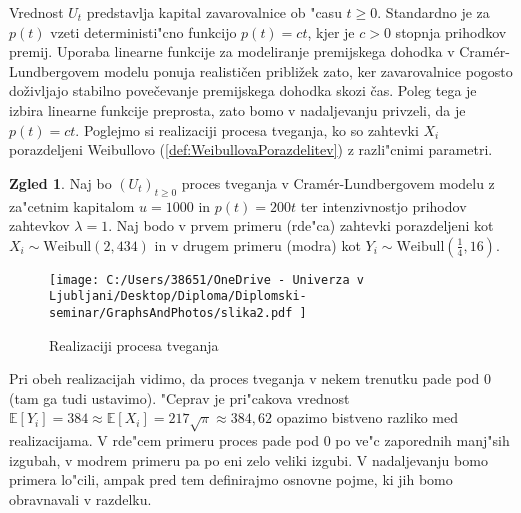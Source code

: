 \documentclass[12pt, a4paper, reqno]{amsart}
\theoremstyle{definition}
\newtheorem{zgled}[definicija]{Zgled}
\theoremstyle{plain}
\newcommand{\E}{\mathbb{E}}
\newcommand{\1}{\mathds{1}}
\begin{document}
        Vrednost $U_t$ predstavlja kapital zavarovalnice ob "casu $t\geq0$. Standardno je za $p(t)$ 
        vzeti deterministi"cno funkcijo $p(t) = ct$, kjer je $c>0$ stopnja prihodkov premij.
        Uporaba linearne funkcije za modeliranje premijskega dohodka v Cramér-Lundbergovem 
        modelu ponuja realističen približek zato, ker zavarovalnice pogosto doživljajo 
        stabilno povečevanje premijskega dohodka skozi čas. Poleg tega je izbira linearne 
        funkcije preprosta, zato bomo v nadaljevanju privzeli, da je $p(t) = ct$. Poglejmo si 
        realizaciji procesa tveganja, ko so zahtevki $X_i$ porazdeljeni Weibullovo 
        (\ref{def:WeibullovaPorazdelitev}) z razli"cnimi parametri. 

        \begin{zgled}
            Naj bo $(U_t)_{t\geq0}$ proces tveganja v Cramér-Lundbergovem modelu z za"cetnim kapitalom
            $u = 1000$ in $p(t) = 200t$ ter intenzivnostjo prihodov zahtevkov $\lambda=1$. %
            Naj bodo v prvem primeru (rde"ca) 
            zahtevki porazdeljeni kot $X_i \sim \text{Weibull}(2, 434)$ in v drugem primeru (modra) kot
            $Y_i \sim \text{Weibull}(\tfrac{1}{4}, 16)$.
            
            \begin{figure}[H]
                \centering
                \texttt{[image: 
                    C:/Users/38651/OneDrive - Univerza v Ljubljani/Desktop/Diploma/Diplomski-seminar/GraphsAndPhotos/slika2.pdf
                    ]}
                \caption{Realizaciji procesa tveganja}
                \label{fig:slika3}
            \end{figure}

            Pri obeh realizacijah vidimo, da proces tveganja v nekem trenutku pade pod $0$ (tam ga 
            tudi ustavimo). "Ceprav je pri"cakova vrednost 
            $\E\left[Y_i\right] = 384 \approx \E\left[X_i\right] = 217\sqrt{\pi} \approx 384,62$ 
            opazimo bistveno razliko med realizacijama. V rde"cem primeru proces pade pod
            $0$ po ve"c zaporednih manj"sih izgubah, v modrem primeru pa po eni zelo veliki izgubi. 
            V nadaljevanju bomo primera lo"cili, ampak pred tem 
            definirajmo osnovne pojme, ki jih bomo obravnavali v razdelku.

            \label{zgd:weibullProcesTveganja}
        \end{zgled}
\end{document}
